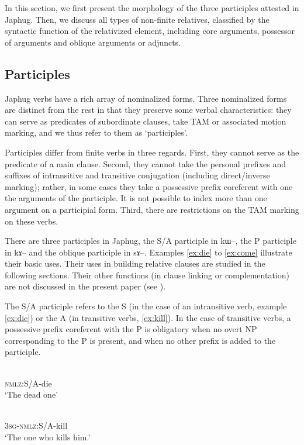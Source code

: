 \documentclass[oldfontcommands,oneside,a4paper,11pt]{article}
\newcommand{\ipa}[1]{{\phon #1}} %
\begin{document}
In this section, we first present the morphology of the three participles attested in Japhug. Then, we discuss all types of non-finite relatives, classified by the syntactic function of the relativized element, including core arguments, possessor of arguments and oblique arguments or adjuncts.



\subsection{Participles}
Japhug verbs have a rich array of nominalized forms. Three nominalized forms are distinct from the rest in that they preserve some verbal characteristics: they can serve as predicates of subordinate clauses, take TAM or associated motion marking, and we thus refer to them as `participles'. 

Participles differ from finite verbs in three regards. First, they cannot serve as the predicate of a main clause. Second, they cannot take the personal prefixes and suffixes of intransitive and transitive conjugation (including direct/inverse marking); rather, in some cases they take a possessive prefix coreferent with one the arguments of the participle. It is not possible to index more than one argument on a participial form. Third, there are restrictions on the TAM marking on these verbs.

There are three participles in Japhug, the S/A participle in \ipa{kɯ--}, the P participle in \ipa{kɤ--} and the oblique participle in \ipa{sɤ--}. Examples \ref{ex:die} to \ref{ex:come} illustrate their basic uses. Their uses in building relative clauses are studied in the following sections. Their other functions (in clause linking or complementation) are not discussed in the present paper (see \citealt{jacques14linking}).

The S/A participle refers to the S (in the case of an intransitive verb, example \ref{ex:die}) or the A (in transitive verbs, \ref{ex:kill}). In the case of transitive verbs, a possessive prefix coreferent with the P is obligatory when no overt NP corresponding to the P is present, and when no other prefix is added to the participle.

 \begin{exe}
\ex \label{ex:die}
\gll \ipa{kɯ-si}    \\
  \textsc{nmlz}:S/A-die \\
 \glt  `The dead one'
\end{exe}

 \begin{exe} 
\ex \label{ex:kill}
\gll \ipa{ɯ-kɯ-sat}    \\
  \textsc{3sg}-\textsc{nmlz}:S/A-kill \\
 \glt  `The one who kills him.'
\end{exe}
\end{document}
